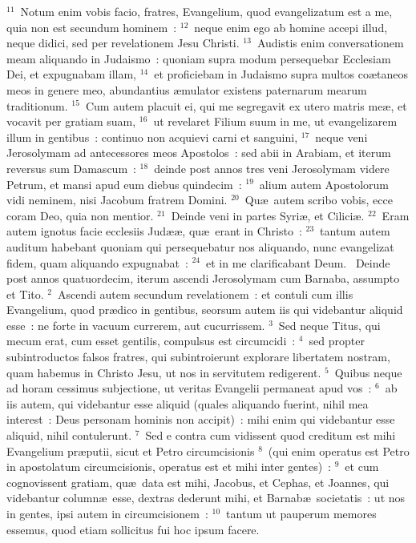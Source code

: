 ${}^{11}$~Notum enim vobis facio, fratres, Evangelium, quod evangelizatum est a me, quia non est secundum hominem~:
${}^{12}$~neque enim ego ab homine accepi illud, neque didici, sed per revelationem Jesu Christi.
${}^{13}$~Audistis enim conversationem meam aliquando in Judaismo~: quoniam supra modum persequebar Ecclesiam Dei, et expugnabam illam,
${}^{14}$~et proficiebam in Judaismo supra multos co\ae taneos meos in genere meo, abundantius \ae mulator existens paternarum mearum traditionum.
${}^{15}$~Cum autem placuit ei, qui me segregavit ex utero matris me\ae , et vocavit per gratiam suam,
${}^{16}$~ut revelaret Filium suum in me, ut evangelizarem illum in gentibus~: continuo non acquievi carni et sanguini,
${}^{17}$~neque veni Jerosolymam ad antecessores meos Apostolos~: sed abii in Arabiam, et iterum reversus sum Damascum~:
${}^{18}$~deinde post annos tres veni Jerosolymam videre Petrum, et mansi apud eum diebus quindecim~:
${}^{19}$~alium autem Apostolorum vidi neminem, nisi Jacobum fratrem Domini.
${}^{20}$~Qu\ae\ autem scribo vobis, ecce coram Deo, quia non mentior.
${}^{21}$~Deinde veni in partes Syri\ae , et Cilici\ae .
${}^{22}$~Eram autem ignotus facie ecclesiis Jud\ae \ae , qu\ae\ erant in Christo~:
${}^{23}$~tantum autem auditum habebant quoniam qui persequebatur nos aliquando, nunc evangelizat fidem, quam aliquando expugnabat~:
${}^{24}$~et in me clarificabant Deum.
~Deinde post annos quatuordecim, iterum ascendi Jerosolymam cum Barnaba, assumpto et Tito.
${}^{2}$~Ascendi autem secundum revelationem~: et contuli cum illis Evangelium, quod pr\ae dico in gentibus, seorsum autem iis qui videbantur aliquid esse~: ne forte in vacuum currerem, aut cucurrissem.
${}^{3}$~Sed neque Titus, qui mecum erat, cum esset gentilis, compulsus est circumcidi~:
${}^{4}$~sed propter subintroductos falsos fratres, qui subintroierunt explorare libertatem nostram, quam habemus in Christo Jesu, ut nos in servitutem redigerent.
${}^{5}$~Quibus neque ad horam cessimus subjectione, ut veritas Evangelii permaneat apud vos~:
${}^{6}$~ab iis autem, qui videbantur esse aliquid (quales aliquando fuerint, nihil mea interest~: Deus personam hominis non accipit)~: mihi enim qui videbantur esse aliquid, nihil contulerunt.
${}^{7}$~Sed e contra cum vidissent quod creditum est mihi Evangelium pr\ae putii, sicut et Petro circumcisionis
${}^{8}$~(qui enim operatus est Petro in apostolatum circumcisionis, operatus est et mihi inter gentes)~:
${}^{9}$~et cum cognovissent gratiam, qu\ae\ data est mihi, Jacobus, et Cephas, et Joannes, qui videbantur column\ae\ esse, dextras dederunt mihi, et Barnab\ae\ societatis~: ut nos in gentes, ipsi autem in circumcisionem~:
${}^{10}$~tantum ut pauperum memores essemus, quod etiam sollicitus fui hoc ipsum facere.


